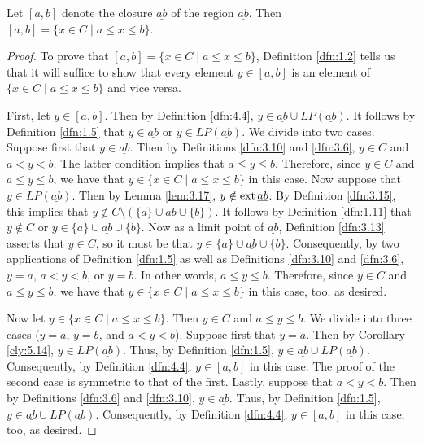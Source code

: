 \documentclass[../main.tex]{subfiles}
\begin{document}
\begin{corollary}\label{cly:5.15}
    Let $[a,b]$ denote the closure $\overline{\underline{ab}}$ of the region $\underline{ab}$. Then $[a,b]=\{x\in C\mid a\leq x\leq b\}$.
    \begin{proof}
        To prove that $[a,b]=\{x\in C\mid a\leq x\leq b\}$, Definition \ref{dfn:1.2} tells us that it will suffice to show that every element $y\in[a,b]$ is an element of $\{x\in C\mid a\leq x\leq b\}$ and vice versa.\par
        First, let $y\in[a,b]$. Then by Definition \ref{dfn:4.4}, $y\in\underline{ab}\cup LP(\underline{ab})$. It follows by Definition \ref{dfn:1.5} that $y\in\underline{ab}$ or $y\in LP(\underline{ab})$. We divide into two cases. Suppose first that $y\in\underline{ab}$. Then by Definitions \ref{dfn:3.10} and \ref{dfn:3.6}, $y\in C$ and $a<y<b$. The latter condition implies that $a\leq y\leq b$. Therefore, since $y\in C$ and $a\leq y\leq b$, we have that $y\in\{x\in C\mid a\leq x\leq b\}$ in this case. Now suppose that $y\in LP(\underline{ab})$. Then by Lemma \ref{lem:3.17}, $y\notin\operatorname{ext}\underline{ab}$. By Definition \ref{dfn:3.15}, this implies that $y\notin C\setminus(\{a\}\cup\underline{ab}\cup\{b\})$. It follows by Definition \ref{dfn:1.11} that $y\notin C$ or $y\in\{a\}\cup\underline{ab}\cup\{b\}$. Now as a limit point of $\underline{ab}$, Definition \ref{dfn:3.13} asserts that $y\in C$, so it must be that $y\in\{a\}\cup\underline{ab}\cup\{b\}$. Consequently, by two applications of Definition \ref{dfn:1.5} as well as Definitions \ref{dfn:3.10} and \ref{dfn:3.6}, $y=a$, $a<y<b$, or $y=b$. In other words, $a\leq y\leq b$. Therefore, since $y\in C$ and $a\leq y\leq b$, we have that $y\in\{x\in C\mid a\leq x\leq b\}$ in this case, too, as desired.\par
        Now let $y\in\{x\in C\mid a\leq x\leq b\}$. Then $y\in C$ and $a\leq y\leq b$. We divide into three cases ($y=a$, $y=b$, and $a<y<b$). Suppose first that $y=a$. Then by Corollary \ref{cly:5.14}, $y\in LP(\underline{ab})$. Thus, by Definition \ref{dfn:1.5}, $y\in\underline{ab}\cup LP(\underline{ab})$. Consequently, by Definition \ref{dfn:4.4}, $y\in[a,b]$ in this case. The proof of the second case is symmetric to that of the first. Lastly, suppose that $a<y<b$. Then by Definitions \ref{dfn:3.6} and \ref{dfn:3.10}, $y\in\underline{ab}$. Thus, by Definition \ref{dfn:1.5}, $y\in\underline{ab}\cup LP(\underline{ab})$. Consequently, by Definition \ref{dfn:4.4}, $y\in[a,b]$ in this case, too, as desired.
    \end{proof}
\end{corollary}
\end{document}
